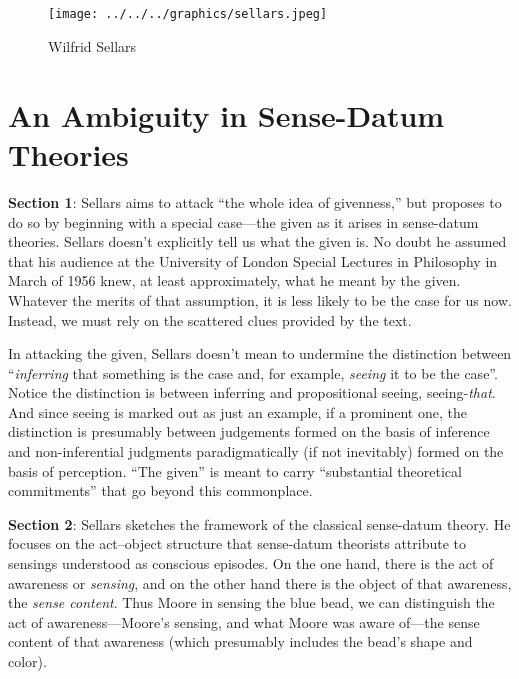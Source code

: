 \documentclass[11pt]{article}
\title{\mytitle\\
\mysubtitle}
\author{\myauthor}
\date{} %
\begin{document}
\maketitle

\setlength{\parindent}{1em}


\begin{figure}[htbp]
	\centering
		\texttt{[image: ../../../graphics/sellars.jpeg]}
	\caption{Wilfrid Sellars}
	\label{fig:sellars}
\end{figure}

\section{An Ambiguity in Sense-Datum Theories} %
\label{sec:an_ambiguity_in_sense_datum_theories}

\textbf{Section 1}: Sellars aims to attack ``the whole idea of givenness,'' but proposes to do so by beginning with a special case---the given as it arises in sense-datum theories. Sellars doesn't explicitly tell us what the given is. No doubt he assumed that his audience at the University of London Special Lectures in Philosophy in March of 1956 knew, at least approximately, what he meant by the given. Whatever the merits of that assumption, it is less likely to be the case for us now. Instead, we must rely on the scattered clues provided by the text.

In attacking the given, Sellars doesn't mean to undermine the distinction between ``\emph{inferring} that something is the case and, for example, \emph{seeing} it to be the case''. Notice the distinction is between inferring and propositional seeing, seeing-\emph{that}. And since seeing is marked out as just an example, if a prominent one, the distinction is presumably between judgements formed on the basis of inference and non-inferential judgments paradigmatically (if not inevitably) formed on the basis of perception. ``The given'' is meant to carry ``substantial theoretical commitments'' that go beyond this commonplace.

\textbf{Section 2}: Sellars sketches the framework of the classical sense-datum theory. He focuses on the act--object structure that sense-datum theorists attribute to sensings understood as conscious episodes. On the one hand, there is the act of awareness or \emph{sensing}, and on the other hand there is the object of that awareness, the \emph{sense content}. Thus Moore in sensing the blue bead, we can distinguish the act of awareness---Moore's sensing, and what Moore was aware of---the sense content of that awareness (which presumably includes the bead's shape and color).
\end{document}
